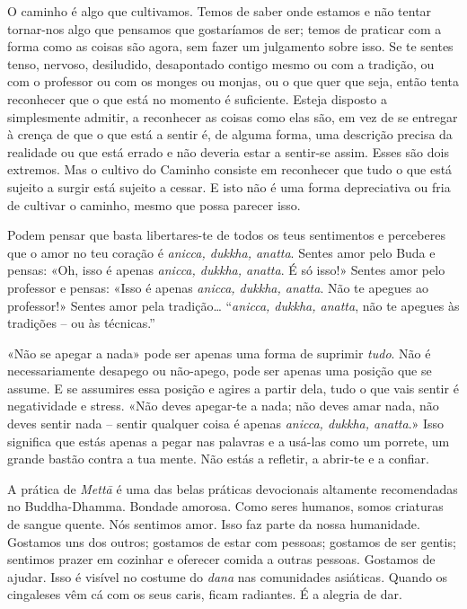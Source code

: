 O caminho é algo que cultivamos. Temos de saber onde estamos e não tentar
tornar-nos algo que pensamos que gostaríamos de ser; temos de praticar com a
forma como as coisas são agora, sem fazer um julgamento sobre isso. Se te sentes
tenso, nervoso, desiludido, desapontado contigo mesmo ou com a tradição, ou com
o professor ou com os monges ou monjas, ou o que quer que seja, então tenta
reconhecer que o que está no momento é suficiente. Esteja disposto a
simplesmente admitir, a reconhecer as coisas como elas são, em vez de se
entregar à crença de que o que está a sentir é, de alguma forma, uma descrição
precisa da realidade ou que está errado e não deveria estar a sentir-se assim.
Esses são dois extremos. Mas o cultivo do Caminho consiste em reconhecer que
tudo o que está sujeito a surgir está sujeito a cessar. E isto não é uma forma
depreciativa ou fria de cultivar o caminho, mesmo que possa parecer isso.

Podem pensar que basta libertares-te de todos os teus sentimentos e perceberes
que o amor no teu coração é \emph{anicca, dukkha, anatta}. Sentes amor pelo Buda
e pensas: «Oh, isso é apenas \emph{anicca, dukkha, anatta}. É só isso!» Sentes
amor pelo professor e pensas: «Isso é apenas \emph{anicca, dukkha, anatta}. Não
te apegues ao professor!» Sentes amor pela tradição\ldots{}
``\emph{anicca, dukkha, anatta}, não te apegues às tradições -- ou às técnicas.''

«Não se apegar a nada» pode ser apenas uma forma de suprimir \emph{tudo}. Não é
necessariamente desapego ou não-apego, pode ser apenas uma posição que se
assume. E se assumires essa posição e agires a partir dela, tudo o que vais
sentir é negatividade e stress. «Não deves apegar-te a nada; não deves amar
nada, não deves sentir nada -- sentir qualquer coisa é apenas \emph{anicca,
  dukkha, anatta}.» Isso significa que estás apenas a pegar nas palavras e a
usá-las como um porrete, um grande bastão contra a tua mente. Não estás a
refletir, a abrir-te e a confiar.

A prática de \emph{Mettā} é uma das belas práticas devocionais altamente
recomendadas no Buddha-Dhamma. Bondade amorosa. Como seres humanos, somos
criaturas de sangue quente. Nós sentimos amor. Isso faz parte da nossa
humanidade. Gostamos uns dos outros; gostamos de estar com pessoas; gostamos de
ser gentis; sentimos prazer em cozinhar e oferecer comida a outras pessoas.
Gostamos de ajudar. Isso é visível no costume do \emph{dana} nas comunidades
asiáticas. Quando os cingaleses vêm cá com os seus caris, ficam radiantes. É a
alegria de dar.

